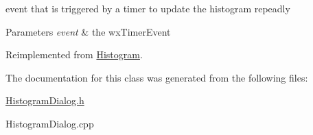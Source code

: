event that is triggered by a timer to update the histogram repeadly 


\begin{DoxyParams}{Parameters}
{\em event} & the wx\+Timer\+Event \\
\hline
\end{DoxyParams}


Reimplemented from \hyperlink{classHistogram}{Histogram}.



The documentation for this class was generated from the following files\+:\begin{DoxyCompactItemize}
\item 
\hyperlink{HistogramDialog_8h}{Histogram\+Dialog.\+h}\item 
Histogram\+Dialog.\+cpp\end{DoxyCompactItemize}
